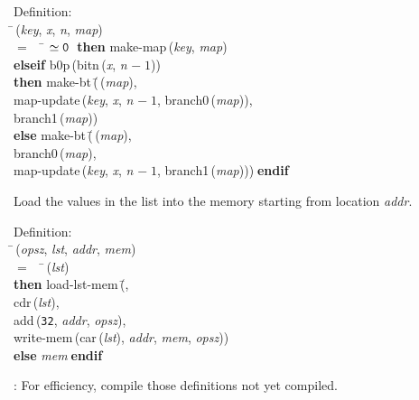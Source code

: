 \begin{tabbing}{\sc Definition}: \\  
\=\,({\it{key\/}}, {\it{x\/}}, {\it{n\/}}, {\it{map\/}}) \\ 
$=$$\;\;\;\;$\= $\simeq {\tt{0}}$$\;\;${\bf then }{\rm{make-map}}\,({\it{key\/}}, {\it{map\/}}) \\ 
{\bf elseif }{\rm{b0p}}\,({\rm{bitn}}\,({\it{x\/}}, {\it{n\/}} $-\;1$)) \\ 
{\bf then }{\rm{make-bt}}\,(\=\,({\it{map\/}}), \\ 
{\rm{map-update}}\,({\it{key\/}}, {\it{x\/}}, {\it{n\/}} $-\;1$, {\rm{branch0}}\,({\it{map\/}})), \\ 
{\rm{branch1}}\,({\it{map\/}}))\- \\ 
{\bf else }{\rm{make-bt}}\,(\=\,({\it{map\/}}), \\ 
{\rm{branch0}}\,({\it{map\/}}), \\ 
{\rm{map-update}}\,({\it{key\/}}, {\it{x\/}}, {\it{n\/}} $-\;1$, {\rm{branch1}}\,({\it{map\/}})))\-$\;${\bf  endif}\-\-
\end{tabbing}

 Load the values in the list into the memory starting from location {\it{addr\/}}.
\begin{tabbing}{\sc Definition}: \\  
\=\,({\it{opsz\/}}, {\it{lst\/}}, {\it{addr\/}}, {\it{mem\/}}) \\ 
$=$$\;\;\;\;$\=\,({\it{lst\/}}) \\ 
{\bf then }{\rm{load-lst-mem}}\,(\=, \\ 
{\rm{cdr}}\,({\it{lst\/}}), \\ 
{\rm{add}}\,({\tt{32}}, {\it{addr\/}}, {\it{opsz\/}}), \\ 
{\rm{write-mem}}\,({\rm{car}}\,({\it{lst\/}}), {\it{addr\/}}, {\it{mem\/}}, {\it{opsz\/}}))\- \\ 
{\bf else }{\it{mem\/}}$\;${\bf  endif}\-\-
\end{tabbing}


:   For efficiency, compile those definitions not yet compiled.

